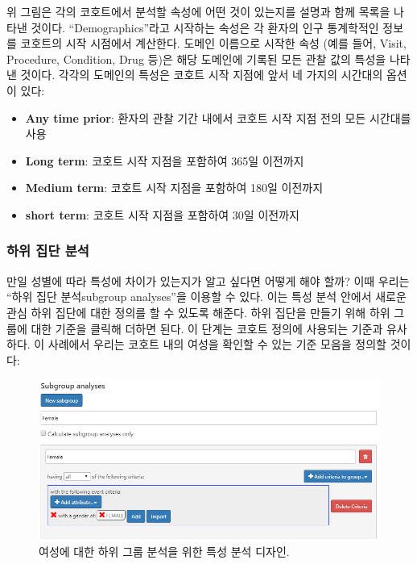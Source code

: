 \documentclass[10.5pt]{book}
\theoremstyle{definition}
\theoremstyle{definition}
\theoremstyle{definition}
\theoremstyle{remark}
\begin{document}
위 그림은 각의 코호트에서 분석할 속성에 어떤 것이 있는지를 설명과 함께
목록을 나타낸 것이다. ``Demographics''라고 시작하는 속성은 각 환자의
인구 통계학적인 정보를 코호트의 시작 시점에서 계산한다. 도메인 이름으로
시작한 속성 (예를 들어, Visit, Procedure, Condition, Drug 등)은 해당
도메인에 기록된 모든 관찰 값의 특성을 나타낸 것이다. 각각의 도메인의
특성은 코호트 시작 지점에 앞서 네 가지의 시간대의 옵션이 있다:

\begin{itemize}
\item
  \textbf{Any time prior}: 환자의 관찰 기간 내에서 코호트 시작 지점 전의
  모든 시간대를 사용
\item
  \textbf{Long term}: 코호트 시작 지점을 포함하여 365일 이전까지
\item
  \textbf{Medium term}: 코호트 시작 지점을 포함하여 180일 이전까지
\item
  \textbf{short term}: 코호트 시작 지점을 포함하여 30일 이전까지
\end{itemize}

\subsubsection*{하위 집단 분석}\label{--}

만일 성별에 따라 특성에 차이가 있는지가 알고 싶다면 어떻게 해야 할까?
이때 우리는 ``하위 집단 분석subgroup analyses''을 이용할 수 있다. 이는
특성 분석 안에서 새로운 관심 하위 집단에 대한 정의를 할 수 있도록
해준다. 하위 집단을 만들기 위해 하위 그룹에 대한 기준을 클릭해 더하면
된다. 이 단계는 코호트 정의에 사용되는 기준과 유사하다. 이 사례에서
우리는 코호트 내의 여성을 확인할 수 있는 기준 모음을 정의할 것이다:

\begin{figure}

{\centering \includegraphics[width=1\linewidth]{images/Characterization/atlasCharacterizationSubgroup} 

}

\caption{여성에 대한 하위 그룹 분석을 위한 특성 분석 디자인.}\label{fig:atlasCharacterizationSubgroup}
\end{figure}
\end{document}
